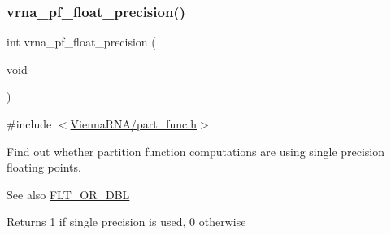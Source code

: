\subsubsection{\texorpdfstring{vrna\+\_\+pf\+\_\+float\+\_\+precision()}{vrna\_pf\_float\_precision()}}
{\footnotesize\ttfamily int vrna\+\_\+pf\+\_\+float\+\_\+precision (\begin{DoxyParamCaption}\item[{void}]{ }\end{DoxyParamCaption})}



{\ttfamily \#include $<$\hyperlink{part__func_8h}{Vienna\+R\+N\+A/part\+\_\+func.\+h}$>$}



Find out whether partition function computations are using single precision floating points. 

\begin{DoxySeeAlso}{See also}
\hyperlink{group__data__structures_ga31125aeace516926bf7f251f759b6126}{F\+L\+T\+\_\+\+O\+R\+\_\+\+D\+BL} 
\end{DoxySeeAlso}
\begin{DoxyReturn}{Returns}
1 if single precision is used, 0 otherwise 
\end{DoxyReturn}
